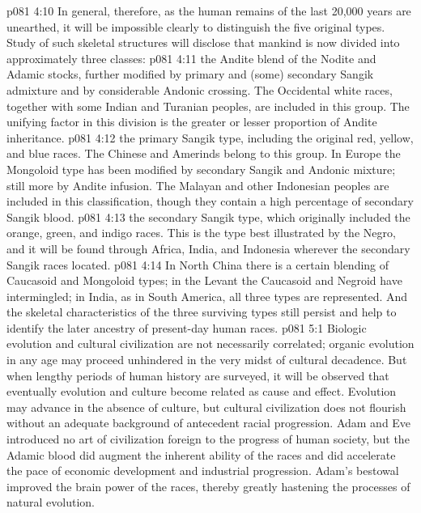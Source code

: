 \vs p081 4:10 In general, therefore, as the human remains of the last 20,000 years are unearthed, it will be impossible clearly to distinguish the five original types. Study of such skeletal structures will disclose that mankind is now divided into approximately three classes:
\vs p081 4:11 \bibnobreakspace {} the Andite blend of the Nodite and Adamic stocks, further modified by primary and (some) secondary Sangik admixture and by considerable Andonic crossing. The Occidental white races, together with some Indian and Turanian peoples, are included in this group. The unifying factor in this division is the greater or lesser proportion of Andite inheritance.
\vs p081 4:12 \bibnobreakspace {} the primary Sangik type, including the original red, yellow, and blue races. The Chinese and Amerinds belong to this group. In Europe the Mongoloid type has been modified by secondary Sangik and Andonic mixture; still more by Andite infusion. The Malayan and other Indonesian peoples are included in this classification, though they contain a high percentage of secondary Sangik blood.
\vs p081 4:13 \bibnobreakspace {} the secondary Sangik type, which originally included the orange, green, and indigo races. This is the type best illustrated by the Negro, and it will be found through Africa, India, and Indonesia wherever the secondary Sangik races located.
\vs p081 4:14 \pc In North China there is a certain blending of Caucasoid and Mongoloid types; in the Levant the Caucasoid and Negroid have intermingled; in India, as in South America, all three types are represented. And the skeletal characteristics of the three surviving types still persist and help to identify the later ancestry of present\hyp{}day human races.
\vs p081 5:1 Biologic evolution and cultural civilization are not necessarily correlated; organic evolution in any age may proceed unhindered in the very midst of cultural decadence. But when lengthy periods of human history are surveyed, it will be observed that eventually evolution and culture become related as cause and effect. Evolution may advance in the absence of culture, but cultural civilization does not flourish without an adequate background of antecedent racial progression. Adam and Eve introduced no art of civilization foreign to the progress of human society, but the Adamic blood did augment the inherent ability of the races and did accelerate the pace of economic development and industrial progression. Adam’s bestowal improved the brain power of the races, thereby greatly hastening the processes of natural evolution.
